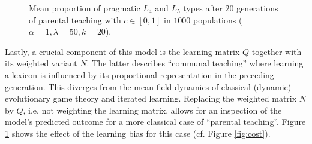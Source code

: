 \documentclass[10pt,a4paper]{article}
\begin{document}
\begin{figure}[t] %
	\centering
	\caption{Mean proportion of pragmatic $L_4$ and $L_5$ types after $20$ generations of parental teaching with $c \in [0,1]$ in $1000$ populations ($\alpha = 1, \lambda = 50, k = 20$).}
	\label{fig:figure3-parental}
\end{figure}


Lastly, a crucial component of this model is the learning matrix $Q$ together with its weighted variant $N$. The latter describes ``communal teaching'' where learning a lexicon is influenced by its proportional representation in the preceding generation. This diverges from the mean field dynamics of classical (dynamic) evolutionary game theory and iterated learning. Replacing the weighted matrix $N$ by $Q$, i.e. not weighting the learning matrix, allows for an inspection of the model's predicted outcome for a more classical case of ``parental teaching''. Figure \ref{fig:figure3-parental} shows the effect of the learning bias for this case (cf. Figure \ref{fig:cost}).
\end{document}
